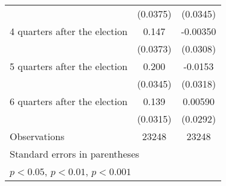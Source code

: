\begin{table}[htbp]
\begin{tabular}{l*{2}{c}}
                    &    (0.0375)         &    (0.0345)         \\
[1em]
 4 quarters after the election&       0.147\sym{***}&    -0.00350         \\
                    &    (0.0373)         &    (0.0308)         \\
[1em]
 5 quarters after the election&       0.200\sym{***}&     -0.0153         \\
                    &    (0.0345)         &    (0.0318)         \\
[1em]
 6 quarters after the election&       0.139\sym{***}&     0.00590         \\
                    &    (0.0315)         &    (0.0292)         \\
\hline
Observations        &       23248         &       23248         \\
\hline\hline
\multicolumn{3}{l}{\footnotesize Standard errors in parentheses}\\
\multicolumn{3}{l}{\footnotesize \sym{*} \(p<0.05\), \sym{**} \(p<0.01\), \sym{***} \(p<0.001\)}\\
\end{tabular}
\end{table}
